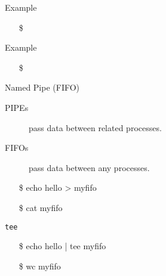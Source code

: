 \begin{frame}{Example}
\begin{center}
\end{center}
\begin{itemize}
\item[\$] 
\end{itemize}
\end{frame}

\begin{frame}{Example}
\begin{center}
\end{center}
\begin{itemize}
\item[\$] 
\end{itemize}
\end{frame}


\begin{frame}{Named Pipe (FIFO)}
  \begin{description}
  \item[PIPEs] pass data between related processes.
  \item[FIFOs] pass data between any processes.
  \end{description}
  \begin{iblock}{}
    \begin{center}
      \begin{minipage}{.45\linewidth}\ttfamily
        \begin{itemize}
        \item[\$] echo hello > myfifo
        \item[\$] cat myfifo
        \end{itemize}
      \end{minipage}\quad
      \begin{minipage}{.5\linewidth}
      \end{minipage}
    \end{center}
  \end{iblock}
  \ttfamily
  \begin{iblock}{\texttt{tee}}
    \begin{minipage}{.5\linewidth}
      \begin{itemize}
      \item[\$] echo hello | tee myfifo
      \item[\$] wc myfifo
      \end{itemize}
    \end{minipage}\quad
    \begin{minipage}{.45\linewidth}
    \end{minipage}
  \end{iblock}
\end{frame}

